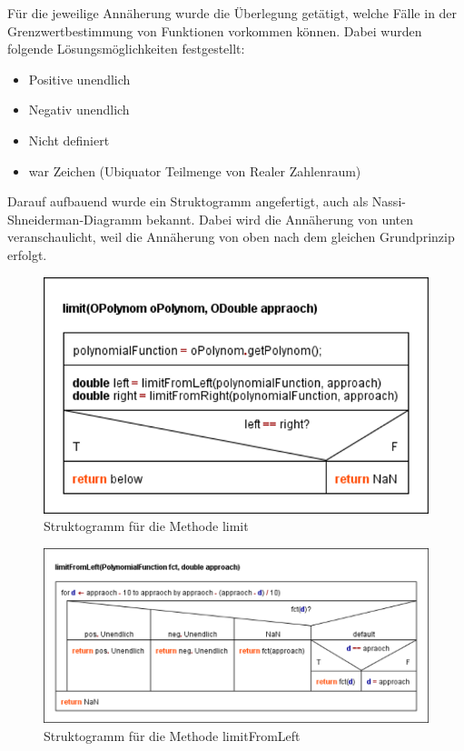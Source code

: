 Für die jeweilige Annäherung wurde die Überlegung getätigt, welche Fälle in der Grenzwertbestimmung von Funktionen vorkommen können. Dabei wurden folgende Lösungsmöglichkeiten festgestellt:
\begin{itemize}
	\item Positive unendlich
	\item Negativ unendlich
	\item Nicht definiert
	\item {} war Zeichen (Ubiquator Teilmenge von Realer Zahlenraum)
\end{itemize}

Darauf aufbauend wurde ein Struktogramm angefertigt, auch als Nassi-Shneiderman-Diagramm bekannt. Dabei wird die Annäherung von unten veranschaulicht, weil die Annäherung von oben nach dem gleichen Grundprinzip erfolgt. 

\begin{figure}[!h]
	\includegraphics[scale=1]{img/struktogramm-limit}
	\caption[Struktogramm für die Methode limit]{Struktogramm für die Methode limit\footnotemark}
\end{figure}
\FloatBarrier


\begin{figure}[!h]
	\includegraphics[scale=1]{img/struktogramm-limitFromLeft}
	\caption[Struktogramm für die Methode limitFromLeft]{Struktogramm für die Methode limitFromLeft\footnotemark}
\end{figure}
\FloatBarrier

